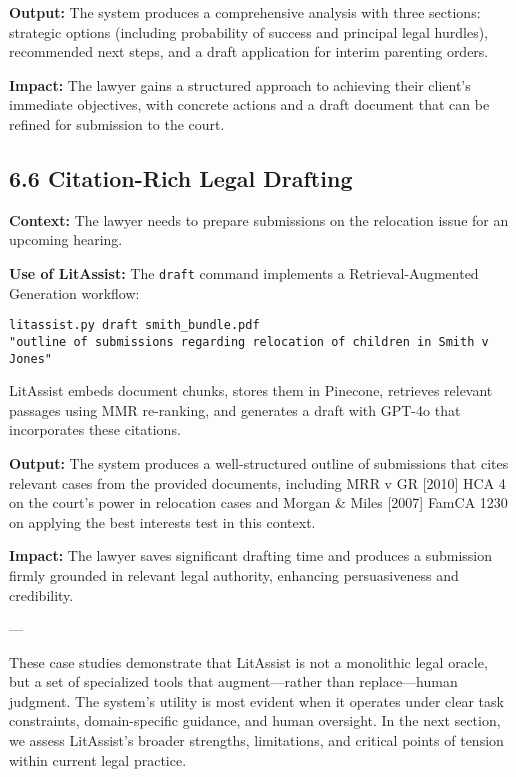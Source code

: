 \documentclass[12pt,a4paper]{article}
\begin{document}
\textbf{Output:} The system produces a comprehensive analysis with three sections: strategic options (including probability of success and principal legal hurdles), recommended next steps, and a draft application for interim parenting orders.

\textbf{Impact:} The lawyer gains a structured approach to achieving their client's immediate objectives, with concrete actions and a draft document that can be refined for submission to the court.

\subsection*{6.6 Citation-Rich Legal Drafting}

\textbf{Context:} The lawyer needs to prepare submissions on the relocation issue for an upcoming hearing.

\textbf{Use of LitAssist:} The \texttt{draft} command implements a Retrieval-Augmented Generation workflow:

\begin{verbatim}
litassist.py draft smith_bundle.pdf 
"outline of submissions regarding relocation of children in Smith v Jones"
\end{verbatim}

LitAssist embeds document chunks, stores them in Pinecone, retrieves relevant passages using MMR re-ranking, and generates a draft with GPT-4o that incorporates these citations.

\textbf{Output:} The system produces a well-structured outline of submissions that cites relevant cases from the provided documents, including MRR v GR [2010] HCA 4 on the court's power in relocation cases and Morgan \& Miles [2007] FamCA 1230 on applying the best interests test in this context.

\textbf{Impact:} The lawyer saves significant drafting time and produces a submission firmly grounded in relevant legal authority, enhancing persuasiveness and credibility.

---

These case studies demonstrate that LitAssist is not a monolithic legal oracle, but a set of specialized tools that augment—rather than replace—human judgment. The system's utility is most evident when it operates under clear task constraints, domain-specific guidance, and human oversight. In the next section, we assess LitAssist's broader strengths, limitations, and critical points of tension within current legal practice.
\end{document}
